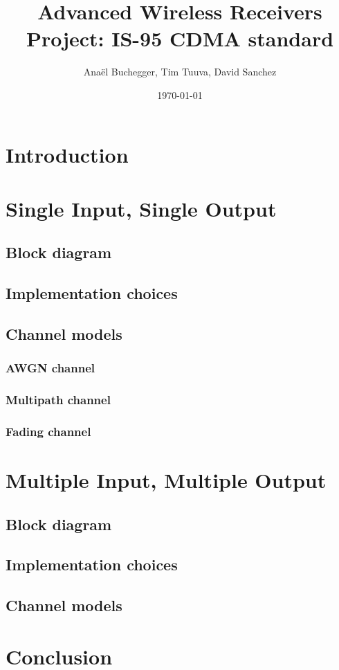 \documentclass[a4paper, 11pt]{article}
\title{Advanced Wireless Receivers Project: IS-95 CDMA standard}
\author{Anaël Buchegger, Tim Tuuva, David Sanchez}
\date{\today}
\begin{document}
\maketitle

\newpage

\tableofcontents
\newpage

\section{Introduction}

\section{Single Input, Single Output}

\subsection{Block diagram}

\subsection{Implementation choices}

\subsection{Channel models}
\subsubsection{AWGN channel}

\subsubsection{Multipath channel}

\subsubsection{Fading channel}

\section{Multiple Input, Multiple Output}

\subsection{Block diagram}

\subsection{Implementation choices}

\subsection{Channel models}

\section{Conclusion}
\end{document}
